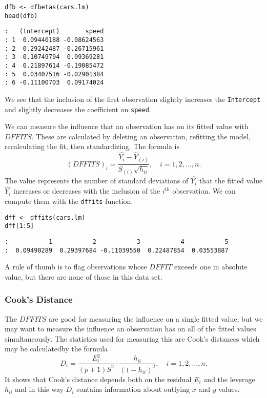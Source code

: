 \begin{verbatim}
dfb <- dfbetas(cars.lm)
head(dfb)
\end{verbatim}

\begin{verbatim}
:   (Intercept)       speed
: 1  0.09440188 -0.08624563
: 2  0.29242487 -0.26715961
: 3 -0.10749794  0.09369281
: 4  0.21897614 -0.19085472
: 5  0.03407516 -0.02901384
: 6 -0.11100703  0.09174024
\end{verbatim}

We see that the inclusion of the first observation slightly increases
the \texttt{Intercept} and slightly decreases the coefficient on \texttt{speed}.

We can measure the influence that an observation has on its fitted
value with \(DFFITS\). These are calculated by deleting an
observation, refitting the model, recalculating the fit, then
standardizing. The formula is
\begin{equation}
(DFFITS)_{i}=\frac{\hat{Y_{i}}-\hat{Y}_{(i)}}{S_{(i)}\sqrt{h_{ii}}},\quad i=1,2,\ldots,n.
\end{equation}
The value represents the number of standard deviations of
\(\hat{Y_{i}}\) that the fitted value \(\hat{Y_{i}}\) increases or
decreases with the inclusion of the \(i^{\textrm{th}}\)
observation. We can compute them with the \texttt{dffits} function.

\begin{verbatim}
dff <- dffits(cars.lm)
dff[1:5]
\end{verbatim}

\begin{verbatim}
:           1           2           3           4           5 
:  0.09490289  0.29397684 -0.11039550  0.22487854  0.03553887
\end{verbatim}

A rule of thumb is to flag observations whose \(DFFIT\) exceeds one in
absolute value, but there are none of those in this data set.

\subsubsection{Cook's Distance}
\label{sec-11-5-4-2}

The \(DFFITS\) are good for measuring the influence on a single fitted
value, but we may want to measure the influence an observation has on
all of the fitted values simultaneously. The statistics used for
measuring this are Cook's distances which may be
calculatedby the formula
\begin{equation}
\label{eq-slr-cooks-distance}
D_{i}=\frac{E_{i}^{2}}{(p+1)S^{2}}\cdot\frac{h_{ii}}{(1-h_{ii})^{2}},\quad i=1,2,\ldots,n.
\end{equation}
It shows that Cook's distance depends both on the residual \(E_{i}\)
and the leverage \(h_{ii}\) and in this way \(D_{i}\) contains
information about outlying \(x\) and \(y\) values.

